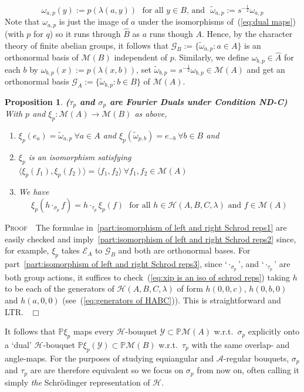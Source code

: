 \documentclass[12pt]{article}
\newtheorem{prop}{Proposition}[section]
\newcounter{example}[section]
\newcommand{\addwords}[1]{\ \ \ \mbox{#1}}
\newcommand{\bbP}{\ensuremath{\mathbb{P}}}
\newcommand{\bPf}{\noindent \textsc{Proof\ }}
\newcommand{\cA}{\ensuremath{\mathcal{A}}}
\newcommand{\cE}{\ensuremath{\mathcal{E}}}
\newcommand{\cG}{\ensuremath{\mathcal{G}}}
\newcommand{\cH}{\ensuremath{\mathcal{H}}}
\newcommand{\cM}{\mathcal{M}}
\newcommand{\cY}{\ensuremath{\mathcal{Y}}}
\newcommand{\ePf}{~$\Box$\vertsp\par}%
\renewcommand{\t}[1]{\tilde{#1}}
\newcommand{\vertsp}{\vspace{1ex}}
\newcommand{\Hei}[4]{\cH({#1},{#2},{#3},{#4})}
\newcommand{\HeiStan}{\Hei{A}{B}{C}{\lambda}}
\begin{document}
$$
\omega_{a,p}(y):=p(\lambda(a,y))\addwords{for all $y\in B$,  and}\ \ \ \t \omega_{a,p}:=s^{-\frac12}\omega_{a,p}
$$ 
Note that $\omega_{a,p}$ is just the image of $a$ under the isomorphisms of~(\ref{eq:dual maps}) (with $p$ for $q$) so it runs through $\hat B$ as $a$ runs though $A$. Hence, by the character theory of finite abelian groups, it follows that $\cG_B:=\{\t \omega_{a,p}:a\in A\}$ is an orthonormal basis of $\cM(B)$ independent of $p$. Similarly, we define 
$\omega_{b,p}\in \hat A$ for each $b$ by $\omega_{b,p}(x):=p(\lambda(x,b))$, set $\t \omega_{b,p}=s^{-\frac12}\omega_{b,p}\in \cM(A)$ and get an orthonormal basis $\cG_A:=\{\t \omega_{b,p}:b\in B\}$ of $\cM(A)$. 
\begin{prop}\label{prop:isomorphism of left and right Schrod reps} {\bf($\tau_p$ and $\sigma_p$ are Fourier Duals under Condition ND-C)}\\
	With $p$ and $\xi_p : \cM(A)\longrightarrow\cM(B)$ as above, 
	\begin{enumerate}
		\item\label{part:isomorphism of left and right Schrod reps1} 
		$\xi_p(e_a)=\t \omega_{a,p}\ \forall a\in A$ and $\xi_p(\t \omega_{p,b})=e_{-b}\ \forall b\in B$ and 						 
		\item\label{part:isomorphism of left and right Schrod reps2}
		 $\xi_p$ is an isomorphism satisfying 
		$\langle \xi_p(f_1), \xi_p(f_2)\rangle=\langle f_1, f_2\rangle\  \forall f_1,f_2\in \cM(A)$ 
		\item\label{part:isomorphism of left and right Schrod reps3} We have
		\begin{equation}\label{eq:xip is an iso of schrod reps}
			\xi_p(h\cdot_{\sigma_p}f)= h\cdot_{\tau_p}\xi_p(f)
			\addwords{for all $h\in\HeiStan$ and $f\in \cM(A)$}
		\end{equation}
	\end{enumerate}
\end{prop}
\bPf\ The formulae in~\ref{part:isomorphism of left and right Schrod reps1} are easily checked and imply~\ref{part:isomorphism of left and right Schrod reps2} since, for example, $\xi_p$ takes $\cE_A$ to $\cG_B$ and both are orthonormal bases. For part~\ref{part:isomorphism of left and right Schrod reps3}, since `$\cdot_{\sigma_p}$', and `$\cdot_{\tau_p}$' are both group actions,   
it suffices to check~(\ref{eq:xip is an iso of schrod reps}) taking $h$ to be each of the generators of $\HeiStan$ of form $h(0,0,c)$, $h(0,b,0)$ and $h(a,0,0)$ 
(see~(\ref{eq:generators of HABC})). This is straightforward and LTR.
\ePf
\noindent It follows that $\bbP\xi_p$ maps every $\cH$-bouquet  $\cY\subset\bbP\cM(A)$ w.r.t.\ $\sigma_p$ explicitly onto a `dual' $\cH$-bouquet $\bbP\xi_p(\cY)\subset\bbP\cM(B)$ w.r.t.\ $\tau_p$ with the same overlap- and angle-maps. For the purposes of studying equiangular and $\cA$-regular bouquets, $\sigma_p$ and $\tau_p$ are are therefore equivalent so we focus on $\sigma_p$ from now on, often calling it simply \textit{the} Schr\"odinger representation of $\cH$. 
\end{document}
